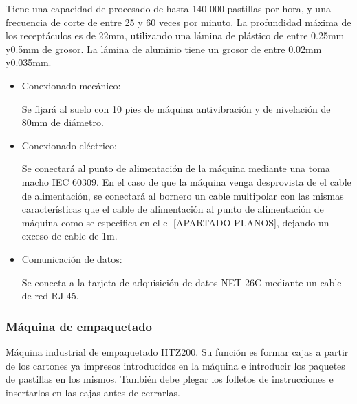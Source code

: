 	Tiene una capacidad de procesado de hasta 140 000 pastillas por hora, y una frecuencia de corte de entre 25 y 60 veces por minuto. La profundidad máxima de los receptáculos es de 22mm, utilizando una lámina de plástico de entre 0.25mm y0.5mm de grosor. La lámina de aluminio tiene un grosor de entre 0.02mm y0.035mm.


		\begin{itemize}
				\item{Conexionado mecánico:}
				
				Se fijará al suelo con 10 pies de máquina antivibración y de nivelación de 80mm de diámetro.

				\item{Conexionado eléctrico:}

				Se conectará al punto de alimentación de la máquina mediante una  toma macho IEC 60309. En el caso de que la máquina venga desprovista de el cable de alimentación, se conectará al bornero un cable multipolar con las mismas características que el cable de alimentación al punto de alimentación de máquina como se especifica en el el [APARTADO PLANOS], dejando un exceso de cable de 1m. \
				
				\item{Comunicación de datos:}

				Se conecta a la tarjeta de adquisición de datos NET-26C mediante un cable de red RJ-45.
		\end{itemize}
	
	\newpage

	\subsubsection{Máquina de empaquetado}

	

	Máquina industrial de empaquetado HTZ200. Su función es formar cajas a partir de los cartones ya impresos introducidos en la máquina e introducir los paquetes de pastillas en los mismos. También debe plegar los folletos de instrucciones e insertarlos en las cajas antes de cerrarlas. \\

